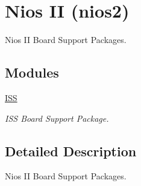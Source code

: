 \hypertarget{group__RTEMSBSPsNios2}{}\section{Nios II (nios2)}
\label{group__RTEMSBSPsNios2}


Nios II Board Support Packages.  


\subsection*{Modules}
\begin{DoxyCompactItemize}
\item 
\mbox{\hyperlink{group__RTEMSBSPsNios2ISS}{I\+SS}}
\begin{DoxyCompactList}\small\item\em I\+SS Board Support Package. \end{DoxyCompactList}\end{DoxyCompactItemize}


\subsection{Detailed Description}
Nios II Board Support Packages. 

